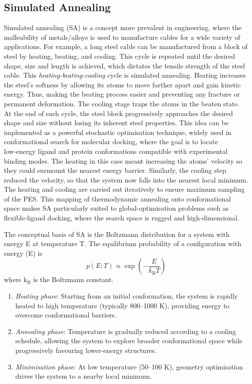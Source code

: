 \documentclass[12pt]{article}
\begin{document}
\subsection{Simulated Annealing}

Simulated annealing (SA) is a concept more prevalent in engineering, where the malleability of metals/alloys is used to manufacture cables for a wide variety of applications. For example, a long steel cable can be manufactured from a block of steel by heating, beating, and cooling. This cycle is repeated until the desired shape, size and length is achieved, which dictates the tensile strength of the steel cable. This \emph{heating-beating-cooling} cycle is simulated annealing. Heating increases the steel's softness by allowing its atoms to move farther apart and gain kinetic energy. Thus, making the beating process easier and preventing any fracture or permanent deformation. The cooling stage traps the atoms in the beaten state. At the end of each cycle, the steel block progressively approaches the desired shape and size without losing its inherent steel properties. This idea can be implemented as a powerful stochastic optimisation technique\cite{CH2_Kirkpatrick1983}, widely used in conformational search for molecular docking, where the goal is to locate low‑energy ligand and protein conformations compatible with experimental binding modes. The heating in this case meant increasing the atoms' velocity so they could surmount the nearest energy barrier. Similarly, the cooling step reduced the velocity, so that the system now falls into the nearest local minimum. The heating and cooling are carried out iteratively to ensure maximum sampling of the PES. This mapping of thermodynamic annealing onto conformational space makes SA particularly suited to global-optimisation problems such as flexible‑ligand docking, where the search space is rugged and high‑dimensional\cite{CH2_Ghose1993,CH2_Naidoo1997,CH2_Corcho2000}.

The conceptual basis of SA is the Boltzmann distribution for a system with energy E at temperature T.
The equilibrium probability of a configuration with energy (E) is
\begin{equation}
    p(E;T) \propto \exp\!\left(-\frac{E}{k_{\mathrm{B}} T}\right)
    \label{eq:BOLTZ_PROB}
\end{equation}
where $\textrm{k}_{\mathrm{\textrm{B}}}$ is the Boltzmann constant. 

\begin{enumerate}
\item \textit{Heating phase}: Starting from an initial conformation, the system is rapidly heated to high temperature (typically 800–1000 K), providing energy to overcome conformational barriers.
\item \textit{Annealing phase}: Temperature is gradually reduced according to a cooling schedule, allowing the system to explore broader conformational space while progressively favouring lower-energy structures.
\item \textit{Minimisation phase}: At low temperature (50–100 K), geometry optimisation drives the system to a nearby local minimum.
\end{enumerate}
\end{document}
